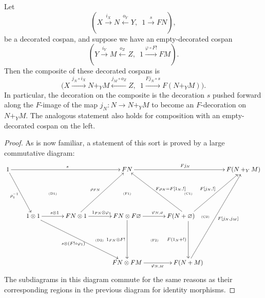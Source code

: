 \begin{lemma} \label{lem.emptydecorations}
  Let
\[
  (X \stackrel{i_X}\longrightarrow N
\stackrel{o_Y}\longleftarrow Y,\enspace 1 \stackrel{s}\longrightarrow FN),
\]
be a decorated cospan, and suppose we have an empty-decorated cospan 
\[
  (Y \stackrel{i_Y}\longrightarrow M \stackrel{o_Z}\longleftarrow Z,\enspace 1
  \stackrel{\varphi\circ F!}\longrightarrow FM).
\]
Then the composite of these decorated cospans is 
\[
  \big(X \xrightarrow{j_N \circ i_X} N+_YM \xleftarrow{j_M \circ o_Z} Z,\enspace 
  1 \xrightarrow{Fj_N \circ s} F(N+_YM)\big).
\]
In particular, the decoration on the composite is the decoration $s$ pushed
forward along the $F$-image of the map $j_N\colon N \to N+_YM$ to become an
$F$-decoration on $N+_YM$. The analogous statement also holds for composition
with an empty-decorated cospan on the left.
\end{lemma}
\begin{proof}
As is now familiar, a statement of this sort is proved by a large commutative
diagram:
\[
  \xymatrixcolsep{.63pc}
  \xymatrix{
    1 \ar[rrrrrr]^s \ar[ddrr]_{\rho_1^{-1}} &&&&&& FN \ar[rrrr]^{Fj_N} &&&& F(N+_YM) \\
    &&& \textrm{\tiny(D1)} &&& \textrm{\tiny(F1)} && \textrm{\tiny(C1)} \\
    && 1 \otimes 1 \ar[rr]^{s\otimes 1} \ar[ddrrrr]_{s \otimes (F! \circ
    \varphi_1)} && FN \otimes 1 \ar[uurr]^{\rho_{FN}} \ar[rr]^{1_{FN}
  \otimes \varphi_1}
    && FN \otimes F\varnothing \ar[rr]^{\varphi_{N,\varnothing}} \ar[dd]_{1_{FN}
  \otimes F!} && F(N+\varnothing) \ar[uull]_{F\rho_N=F[1_N,!]}
  \ar[uurr]^{F[j_N,!]}
      \ar[dd]_{F(1_N+!)} \quad \textrm{\tiny(C2)}\\
      &&&&& \textrm{\tiny(D2)} && \textrm{\tiny(F2)}\\
      &&&&&& FN \otimes FM \ar[rr]_{\varphi_{N,M}} && F(N+M)
      \ar[uuuurr]_{F[j_N,j_M]}
  }
\]
The subdiagrams in this diagram commute for the same reasons as their
corresponding regions in the previous diagram for identity morphisms. 
\end{proof}

